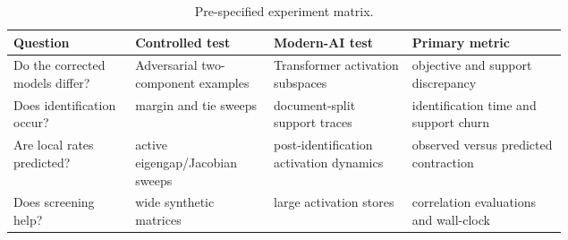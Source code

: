 \begin{table}[t]
\centering
\caption{Pre-specified experiment matrix.}
\label{tab:experiment-matrix}
\small
\begin{tabularx}{0.98\linewidth}{@{}p{0.22\linewidth}p{0.25\linewidth}p{0.25\linewidth}X@{}}
\toprule
\textbf{Question} & \textbf{Controlled test} & \textbf{Modern-AI test} & \textbf{Primary metric} \\
\midrule
Do the corrected models differ? & Adversarial two-component examples & Transformer activation subspaces & objective and support discrepancy \\
Does identification occur? & margin and tie sweeps & document-split support traces & identification time and support churn \\
Are local rates predicted? & active eigengap/Jacobian sweeps & post-identification activation dynamics & observed versus predicted contraction \\
Does screening help? & wide synthetic matrices & large activation stores & correlation evaluations and wall-clock \\
\bottomrule
\end{tabularx}
\end{table}
